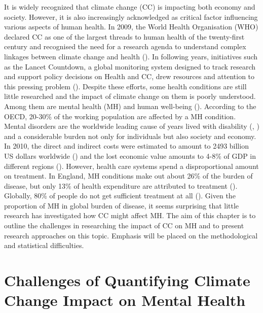 \documentclass[
]{krantz}
\begin{document}
It is widely recognized that climate change (CC) is impacting both economy and society. However, it is also increasingly acknowledged as critical factor influencing various aspects of human health. In 2009, the World Health Organisation (WHO) declared CC as one of the largest threads to human health of the twenty-first century and recognised the need for a research agenda to understand complex linkages between climate change and health (\citet{worldhealthorganization2009}). In following years, initiatives such as the Lancet Countdown, a global monitoring system designed to track research and support policy decisions on Health and CC, drew resources and attention to this pressing problem (\citet{watts2018}). Despite these efforts, some health conditions are still little researched and the impact of climate change on them is poorly understood. Among them are mental health (MH) and human well-being (\citet{romanello2023}).
According to the OECD, 20-30\% of the working population are affected by a MH condition. Mental disorders are the worldwide leading cause of years lived with disability (\citet{whiteford2013}, \citet{hewlette2014}) and a considerable burden not only for individuals but also society and economy. In 2010, the direct and indirect costs were estimated to amount to 2493 billion US dollars worldwide (\citet{hewlette2014}) and the lost economic value amounts to 4-8\% of GDP in different regions (\citet{arias2022}). However, health care systems spend a disproportional amount on treatment. In England, MH conditions make out about 26\% of the burden of disease, but only 13\% of health expenditure are attributed to treatment (\citet{hewlette2014}). Globally, 80\% of people do not get sufficient treatment at all (\citet{worldhealthorganization2021}).
Given the proportion of MH in global burden of disease, it seems surprising that little research has investigated how CC might affect MH. The aim of this chapter is to outline the challenges in researching the impact of CC on MH and to present research approaches on this topic. Emphasis will be placed on the methodological and statistical difficulties.

\section{Challenges of Quantifying Climate Change Impact on Mental Health}\label{challenges-of-quantifying-climate-change-impact-on-mental-health}
\end{document}
